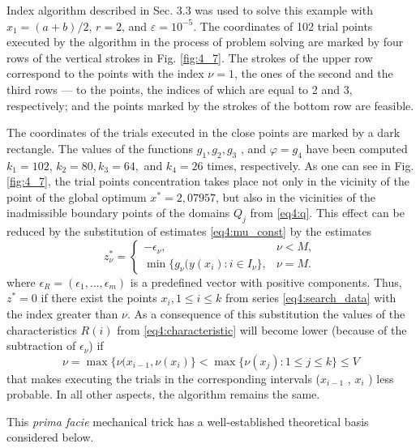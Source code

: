 \documentclass[graybox]{svmult}
\begin{document}
Index algorithm described in Sec. 3.3 was used to solve this example with $x_1=(a+b)/2$, $r=2$, and $\varepsilon=10^{-5}$. The coordinates of 102 trial points executed by the algorithm in the process of problem solving are marked by four rows of the vertical strokes in Fig. \ref{fig:4_7}. The strokes of the upper row correspond to the points with the index $\nu=1$, the ones of the second and the third rows --- to the points, the indices of which are equal to 2 and 3, respectively; and the points
marked by the strokes of the bottom row are feasible.

The coordinates of the trials executed in the close points are marked by a dark rectangle. The values of the functions $g_1 , g_2 , g_3$ , and $\varphi=g_4$ have been computed $k_1=102$, $k_2=80, k_3=64,$ and $k_4=26$ times, respectively. As one can see in Fig. \ref{fig:4_7}, the trial points concentration takes place not only in the vicinity of the point of the global optimum $x^*=2,07957$, but also in the vicinities of the inadmissible boundary points of the domains $Q_j$ from \eqref{eq4:q}. This effect can be reduced by the substitution of estimates \eqref{eq4:mu_const} by the estimates
\begin{equation}
  \label{eq4:mu_const}
  z_\nu^\ast = \left\{
  \begin{array}{lr}
    -\epsilon_\nu, & \nu < M,\\
    \min\{ g_\nu(y(x_i): i\in I_\nu \}, & \nu = M.
  \end{array}
  \right.
\end{equation}
where $\epsilon_R=(\epsilon_1 ,\dots, \epsilon_m)$ is a predefined vector with positive components. Thus, $z^*=0$ if there exist the points $x_i,1\le i\le k$ from series \eqref{eq4:search_data} with the index greater than $\nu$. As a consequence of this substitution the values of the characteristics $R(i)$ from \eqref{eq4:characteristic} will become lower (because of the subtraction of $\epsilon_\nu$) if
\begin{equation}
  \nu=\max\{\nu(x_{i-1},\nu(x_i)\}<\max\{\nu(x_j):1\le j\le k\}\le V
\end{equation}
that makes executing the trials in the corresponding intervals  ($x_{i-1}$ , $x_i$ ) less probable. In all other aspects, the algorithm remains the same.

This \emph{prima facie} mechanical trick has a well-established theoretical basis considered below.
\end{document}
